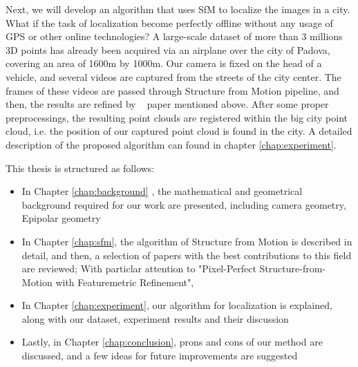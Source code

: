 \documentclass[11pt]{article}
\begin{document}
    Next, we will develop an algorithm that uses SfM to localize the images
    in a city. What if the task of localization become perfectly offline without any usage of GPS or other online technologies?
    A large-scale dataset of more than 3 millions 3D points has already been acquired via an airplane over the city of Padova,
    covering an area of 1600m by 1000m. Our camera is fixed on the head of a vehicle, and several videos are captured
    from the streets of the city center. The frames of these videos are passed through Structure from Motion
    pipeline, and then, the results are refined by ~\cite{lindenberger2021pixsfm} paper mentioned above. After some
    proper preprocessings, the resulting point clouds are registered within the big city point cloud, i.e. the position
    of our captured point cloud is found in the city. A detailed description of the proposed algorithm can found in
    chapter \ref{chap:experiment}.

    This thesis is structured as follows:
    \begin{itemize}
        \item In Chapter \ref{chap:background} , the mathematical and geometrical background required for our work are presented, including camera geometry, Epipolar geometry
        \item In Chapter \ref{chap:sfm}, the algorithm of Structure from Motion is described in detail, and then, a selection of papers with the best contributions to this field are reviewed; With particlar attention to "Pixel-Perfect Structure-from-Motion with Featuremetric Refinement", ~\cite{lindenberger2021pixsfm}
        \item In Chapter \ref{chap:experiment}, our algorithm for localization is explained, along with our dataset, experiment results and their discussion
        \item Lastly, in Chapter \ref{chap:conclusion}, prons and cons of our method are discussed, and a few ideas for future improvements are suggested
    \end{itemize}
\end{document}
